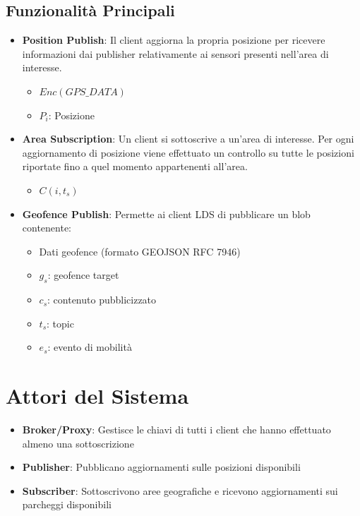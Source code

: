 \documentclass[12pt,a4paper,twoside]{book}
\begin{document}
\subsection{Funzionalità Principali}
\begin{itemize}
    \item \textbf{Position Publish}: Il client aggiorna la propria posizione per ricevere informazioni dai publisher relativamente ai sensori presenti nell'area di interesse.
    \begin{itemize}
        \item $Enc(GPS\_DATA)$
        \item $P_{i}$: Posizione
    \end{itemize}
    
    \item \textbf{Area Subscription}: Un client si sottoscrive a un'area di interesse. Per ogni aggiornamento di posizione viene effettuato un controllo su tutte le posizioni riportate fino a quel momento appartenenti all'area.
    \begin{itemize}
        \item $C(i, t_{s})$
    \end{itemize}
    
    \item \textbf{Geofence Publish}: Permette ai client LDS di pubblicare un blob contenente:
    \begin{itemize}
        \item Dati geofence (formato GEOJSON RFC 7946)
        \item $g_s$: geofence target
        \item $c_{s}$: contenuto pubblicizzato
        \item $t_{s}$: topic
        \item $e_{s}$: evento di mobilità
    \end{itemize}
\end{itemize}

\section{Attori del Sistema}
\begin{itemize}
    \item \textbf{Broker/Proxy}: Gestisce le chiavi di tutti i client che hanno effettuato almeno una sottoscrizione
    \item \textbf{Publisher}: Pubblicano aggiornamenti sulle posizioni disponibili
    \item \textbf{Subscriber}: Sottoscrivono aree geografiche e ricevono aggiornamenti sui parcheggi disponibili
\end{itemize}
\end{document}
